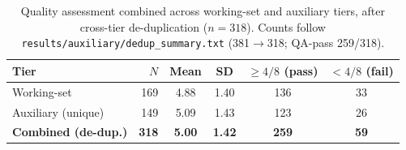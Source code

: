 \begin{table}[htbp]
\centering
\caption{Quality assessment combined across working-set and auxiliary tiers,
after cross-tier de-duplication ($n = 318$). Counts follow
\texttt{results/auxiliary/dedup\_summary.txt} (381$\rightarrow$318;
QA-pass 259/318).}
\label{tab:qa-combined}
\begin{tabular}{lrcccc}
\toprule
Tier & $N$ & Mean & SD & $\geq 4/8$ (pass) & $< 4/8$ (fail) \\
\midrule
Working-set        & 169 & 4.88 & 1.40 & 136 & 33 \\
Auxiliary (unique) & 149 & 5.09 & 1.43 & 123 & 26 \\
\midrule
\textbf{Combined (de-dup.)} & \textbf{318} & \textbf{5.00} & \textbf{1.42} & \textbf{259} & \textbf{59} \\
\bottomrule
\end{tabular}
\end{table}
